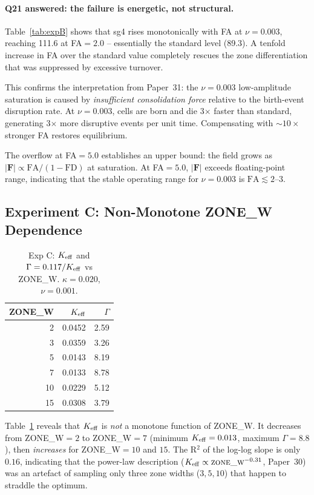 \documentclass[11pt,a4paper]{article}
\begin{document}
\paragraph{Q21 answered: the failure is energetic, not structural.}
Table~\ref{tab:expB} shows that sg4 rises monotonically with FA at $\nu=0.003$, reaching
111.6 at FA$=2.0$ -- essentially the standard level (89.3).  A tenfold increase in FA
over the standard value completely rescues the zone differentiation that was suppressed
by excessive turnover.

This confirms the interpretation from Paper~31: the $\nu=0.003$ low-amplitude saturation
is caused by \emph{insufficient consolidation force} relative to the birth-event
disruption rate.  At $\nu=0.003$, cells are born and die 3$\times$ faster than standard,
generating 3$\times$ more disruptive events per unit time.  Compensating with $\sim10\times$
stronger FA restores equilibrium.

The overflow at FA$=5.0$ establishes an upper bound: the field grows as
$|\mathbf{F}| \propto \mathrm{FA}/(1-\mathrm{FD})$ at saturation.  At FA$=5.0$,
$|\mathbf{F}|$ exceeds floating-point range, indicating that the stable operating range
for $\nu=0.003$ is $\mathrm{FA} \lesssim 2$--$3$.

\subsection{Experiment C: Non-Monotone ZONE\_W Dependence}

\begin{table}[h]
\centering
\caption{Exp C: $K_{\rm eff}$ and $\Gamma=0.117/K_{\rm eff}$ vs ZONE\_W.
  $\kappa=0.020$, $\nu=0.001$.}
\label{tab:expC}
\begin{tabular}{r|rr}
\toprule
ZONE\_W & $K_{\rm eff}$ & $\Gamma$ \\
\midrule
 2 & 0.0452 & 2.59 \\
 3 & 0.0359 & 3.26 \\
 5 & 0.0143 & 8.19 \\
 7 & 0.0133 & 8.78 \\
10 & 0.0229 & 5.12 \\
15 & 0.0308 & 3.79 \\
\bottomrule
\end{tabular}
\end{table}

Table~\ref{tab:expC} reveals that $K_{\rm eff}$ is \emph{not} a monotone function of
ZONE\_W.  It decreases from ZONE\_W$=2$ to ZONE\_W$=7$ (minimum $K_{\rm eff}=0.013$,
maximum $\Gamma=8.8$), then \emph{increases} for ZONE\_W$=10$ and $15$.
The R$^2$ of the log-log slope is only $0.16$, indicating that the power-law
description ($K_{\rm eff} \propto \textsc{zone\_w}^{-0.31}$, Paper~30) was an artefact
of sampling only three zone widths ($3, 5, 10$) that happen to straddle the optimum.
\end{document}
